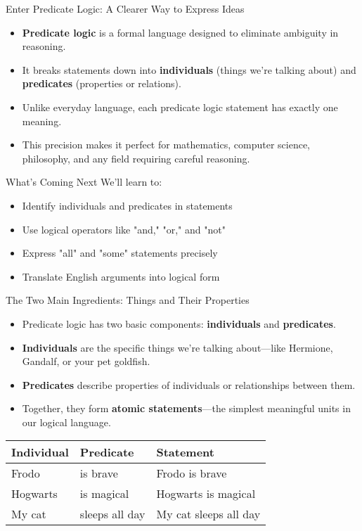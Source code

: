 \documentclass{beamer}
\begin{document}
	\begin{frame}{Enter Predicate Logic: A Clearer Way to Express Ideas}
		\begin{itemize}
			\item \textbf{Predicate logic} is a formal language designed to eliminate ambiguity in reasoning.
			\item It breaks statements down into \textbf{individuals} (things we're talking about) and \textbf{predicates} (properties or relations).
			\item Unlike everyday language, each predicate logic statement has exactly one meaning.
			\item This precision makes it perfect for mathematics, computer science, philosophy, and any field requiring careful reasoning.
		\end{itemize}
		
		\begin{block}{What's Coming Next}
			We'll learn to:
			\begin{itemize}
				\item Identify individuals and predicates in statements
				\item Use logical operators like "and," "or," and "not"
				\item Express "all" and "some" statements precisely
				\item Translate English arguments into logical form
			\end{itemize}
		\end{block}
	\end{frame}
	
	\begin{frame}{The Two Main Ingredients: Things and Their Properties}
		\begin{itemize}
			\item Predicate logic has two basic components: \textbf{individuals} and \textbf{predicates}.
			\item \textbf{Individuals} are the specific things we're talking about—like Hermione, Gandalf, or your pet goldfish.
			\item \textbf{Predicates} describe properties of individuals or relationships between them.
			\item Together, they form \textbf{atomic statements}—the simplest meaningful units in our logical language.
		\end{itemize}
		
		\begin{table}
			\centering
			\begin{tabular}{|l|l|l|}
				\hline
				\textbf{Individual} & \textbf{Predicate} & \textbf{Statement} \\
				\hline
				Frodo & is brave & Frodo is brave \\
				Hogwarts & is magical & Hogwarts is magical \\
				My cat & sleeps all day & My cat sleeps all day \\
				\hline
			\end{tabular}
		\end{table}
	\end{frame}
	
\end{document}
